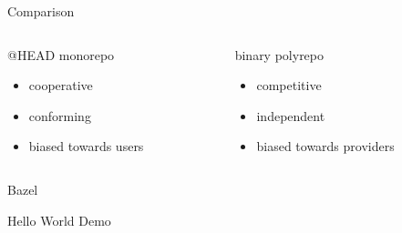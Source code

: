 \documentclass[aspectratio=169]{beamer}
\begin{document}
\begin{frame}{Comparison}
\begin{columns}
    \begin{column}{0.5\textwidth}
    @HEAD monorepo
    \begin{itemize}
        \item<2-> cooperative
        \item<3-> conforming
        \item<4-> biased towards users
    \end{itemize}
    \end{column}
    \begin{column}{0.5\textwidth}
    binary polyrepo
    \begin{itemize}
        \item<2-> competitive
        \item<3-> independent
        \item<4-> biased towards providers
    \end{itemize}
    \end{column}
\end{columns}
\end{frame}

\begin{frame}{}
\begin{center}
    \begin{Huge}
        Bazel
    \end{Huge}
\end{center}
\end{frame}

\begin{frame}{}
    \begin{center}
        \begin{Huge}Hello World Demo\end{Huge}
    \end{center}
\end{frame}

{
\begin{frame}[plain]
\end{frame}
}
\end{document}
